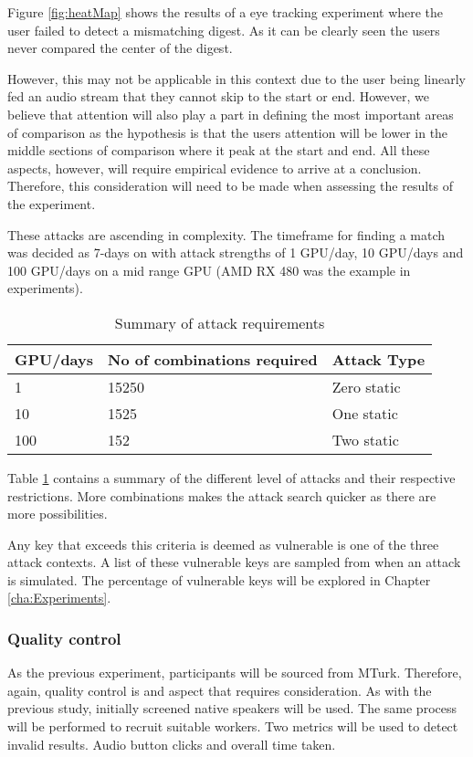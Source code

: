 Figure \ref{fig:heatMap} shows the results of a eye tracking experiment where the user failed to detect a mismatching digest. As it can be clearly seen the users never compared the center of the digest. 

However, this may not be applicable in this context due to the user being linearly fed an audio stream that they cannot skip to the start or end. However, we believe that attention will also play a part in defining the most important areas of comparison as the hypothesis is that the users attention will be lower in the middle sections of comparison where it peak at the start and end. All these aspects, however, will require empirical evidence to arrive at a conclusion. Therefore, this consideration will need to be made when assessing the results of the experiment.

These attacks are ascending in complexity. The timeframe for finding a match was decided as 7-days on with attack strengths of 1 GPU/day, 10 GPU/days and 100 GPU/days on a mid range GPU (AMD RX 480 was the example in experiments). 

\begin{table}[h!]
    \centering
    \begin{tabular}{lll}
        GPU/days & No of combinations required & Attack Type \\
        \hline
        1       & 15250   & Zero static\\
        10      & 1525    & One static\\
        100     & 152     & Two static\\        
    \end{tabular}
    \caption{Summary of attack requirements}
    \label{tab:attackReq}
\end{table}

Table \ref{tab:attackReq} contains a summary of the different level of attacks and their respective restrictions. More combinations makes the attack search quicker as there are more possibilities.

Any key that exceeds this criteria is deemed as vulnerable is one of the three attack contexts. A list of these vulnerable keys are sampled from when an attack is simulated. The percentage of vulnerable keys will be explored in Chapter \ref{cha:Experiments}.

\subsubsection{Quality control}
As the previous experiment, participants will be sourced from MTurk. Therefore, again, quality control is and aspect that requires consideration. As with the previous study, initially screened native speakers will be used. The same process will be performed to recruit suitable workers. Two metrics will be used to detect invalid results. Audio button clicks and overall time taken. 

